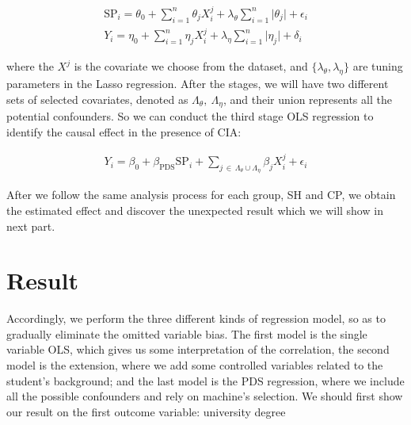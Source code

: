 \documentclass[]{AEA}
\begin{document}
    \begin{align}
    \text{SP}_i = \theta_0 + \sum_{i=1}^n \theta_j X_i^j + \lambda_\theta\sum_{i=1}^n \lvert \theta_j \rvert + \epsilon_i \\
    Y_i         = \eta_0   + \sum_{i=1}^n \eta_j X_i^j   + \lambda_\eta\sum_{i=1}^n \lvert \eta_j   \rvert + \delta_i
    \end{align}

    where the $X^j$ is the covariate we choose from the dataset, and $\{\lambda_\theta,\lambda_\eta\}$ are tuning parameters in the Lasso regression.  After the stages, we will have two different sets of selected covariates, denoted as $\Lambda_\theta,\ \Lambda_\eta$, and their union represents all the potential confounders.  So we can conduct the third stage OLS regression to identify the causal effect in the presence of CIA:

    \begin{align}
        Y_i = \beta_0 + \beta_{\text{PDS}}\text{SP}_i + \sum_{j \,\in\, \Lambda_\theta \cup \Lambda_\eta} \beta_j X_i^j + \epsilon_i
    \end{align}

    After we follow the same analysis process for each group, SH and CP, we obtain the estimated effect and discover the unexpected result which we will show in next part.


\section{Result}

    Accordingly, we perform the three different kinds of regression model, so as to gradually eliminate the omitted variable bias.  The first model is the single variable OLS, which gives us some interpretation of the correlation, the second model is the extension, where we add some controlled variables related to the student's background; and the last model is the PDS regression, where we include all the possible confounders and rely on machine's selection.  We should first show our result on the first outcome variable: university degree
\end{document}
